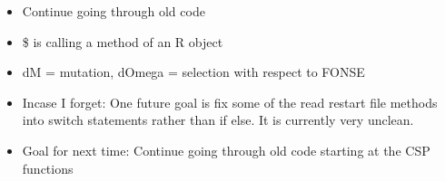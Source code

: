 \documentclass[letterpaper,index=totoc,hyperref,openany]{labbook} %
\begin{document}

\begin{itemize}
	\item Continue going through old code
\end{itemize}

\begin{itemize}
	\item \$ is calling a method of an R object
	\item dM = mutation, dOmega = selection with respect to FONSE
	\item Incase I forget: One future goal is fix some of the read restart file methods into switch statements rather than if else. It is currently very unclean.
	\item Goal for next time: Continue going through old code starting at the CSP functions

\end{itemize}


\printbibliography
\end{document}

